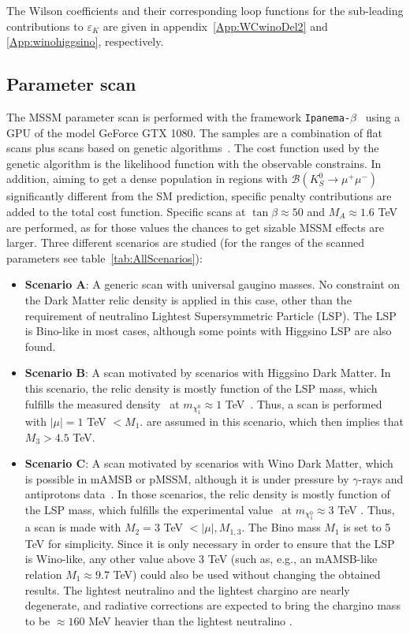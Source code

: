 The Wilson coefficients and their corresponding  loop functions for the sub-leading contributions to $\varepsilon_K$ are given in appendix~\ref{App:WCwinoDel2} and \ref{App:winohiggsino}, respectively. 

\subsection{Parameter scan}
\label{subsec:scan}
The MSSM parameter scan is performed with the framework \texttt{Ipanema-$\beta$}~\cite{Ipanema} using a GPU of the model GeForce GTX 1080. The samples are a combination of flat scans plus scans based on genetic algorithms~\cite{IEEE}. The cost function used by the genetic algorithm is the likelihood function with the observable constrains. In addition, aiming to get a dense population in regions with $\mathcal{B}(K_S^0\rightarrow\mu^+\mu^-)$ significantly different from the SM prediction, specific penalty contributions are added to the total cost function. Specific scans at $\tan\beta \approx 50$ and $M_A \approx 1.6$ TeV are performed, as for those values the chances to get sizable MSSM effects are larger.
Three different scenarios are studied (for the ranges of the scanned parameters see table~\ref{tab:AllScenarios}): 
\begin{itemize}
\item \textbf{Scenario A}: A generic scan with universal gaugino masses. No constraint on the Dark Matter relic density is applied in this case, other than the requirement of neutralino Lightest Supersymmetric Particle (LSP). The LSP is Bino-like in most cases, although some points with Higgsino LSP are also found.
\item \textbf{Scenario B}: A scan motivated by scenarios with Higgsino Dark Matter. In this scenario, the relic density is mostly function of the LSP mass, which fulfills the measured density~\cite{Planck} at $m_{\chi_1^0} \approx 1$ TeV~\cite{Costa:2017gup, Bagnaschi:2017tru,Bagnaschi:2015eha, Bagnaschi:2016xfg}. Thus, a scan is performed with $|\mu| = 1$ TeV $< M_1$.  are assumed in this scenario, which then implies that $M_3> 4.5$ TeV.
\item \textbf{Scenario C}: A scan motivated by scenarios with Wino Dark Matter, which is possible in mAMSB or pMSSM, although it is under pressure by $\gamma$-rays and antiprotons data~\cite{Cuoco:2017iax}. In those scenarios, the relic density is mostly function of the LSP mass, which fulfills the experimental value~\cite{Planck} at $m_{\chi_1^0} \approx 3$ TeV  \cite{Hisano:2006nn,Bagnaschi:2016xfg}. Thus, a scan is made with $M_2 = 3$ TeV $< |\mu|, M_{1,3}$. The Bino mass $M_1$ is set to 5 TeV for simplicity. Since it is only necessary in order to ensure that the LSP is Wino-like, any other value above 3 TeV (such as, e.g., an mAMSB-like relation $M_1\approx 9.7$ TeV) could also be used without changing the obtained results. The lightest neutralino and the lightest chargino are nearly degenerate, and radiative corrections are expected to bring the chargino mass to be $\approx 160$ MeV heavier than the lightest neutralino  \cite{Ibe:2012sx}.
\end{itemize}

